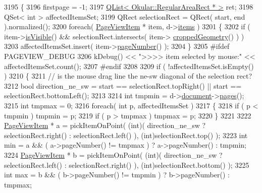 \begin{DoxyCode}
3195 \{
3196     firstpage = -1;
3197     \hyperlink{classQList}{QList< Okular::RegularAreaRect * >} ret;
3198     QSet< int > affectedItemsSet;
3199     QRect selectionRect = QRect( start, end ).normalized();
3200     \textcolor{keywordflow}{foreach}( \hyperlink{classPageViewItem}{PageViewItem} * item, d->\hyperlink{classPageViewPrivate_ad90c795dead9abfaa5818a94e00435bc}{items} )
3201     \{
3202         \textcolor{keywordflow}{if} ( item->\hyperlink{classPageViewItem_ae7a4dfa618d0cb56e01075842c67bf9f}{isVisible}() && selectionRect.intersects( item->
      \hyperlink{classPageViewItem_aa2c3e988ccbe9ee162b73d7f89ab0d02}{croppedGeometry}() ) )
3203             affectedItemsSet.insert( item->\hyperlink{classPageViewItem_ad75aab4c1ffd842bd5d54c0cfe84d1bf}{pageNumber}() );
3204     \}
3205 \textcolor{preprocessor}{#ifdef PAGEVIEW\_DEBUG}
3206     kDebug() << \textcolor{stringliteral}{">>>> item selected by mouse:"} << affectedItemsSet.count();
3207 \textcolor{preprocessor}{#endif}
3208 
3209     \textcolor{keywordflow}{if} ( !affectedItemsSet.isEmpty() )
3210     \{
3211         \textcolor{comment}{// is the mouse drag line the ne-sw diagonal of the selection rect?}
3212         \textcolor{keywordtype}{bool} direction\_ne\_sw = start == selectionRect.topRight() || start == selectionRect.bottomLeft();
3213 
3214         \textcolor{keywordtype}{int} tmpmin = d->\hyperlink{classPageViewPrivate_a50645b9853306cffd74e51efb677e5b4}{document}->\hyperlink{classOkular_1_1Document_aaf5d986758e25127946986abaa401bcd}{pages}();
3215         \textcolor{keywordtype}{int} tmpmax = 0;
3216         \textcolor{keywordflow}{foreach}( \textcolor{keywordtype}{int} p, affectedItemsSet )
3217         \{
3218             \textcolor{keywordflow}{if} ( p < tmpmin ) tmpmin = p;
3219             \textcolor{keywordflow}{if} ( p > tmpmax ) tmpmax = p;
3220         \}
3221 
3222         \hyperlink{classPageViewItem}{PageViewItem} * a = pickItemOnPoint( (\textcolor{keywordtype}{int})( direction\_ne\_sw ? selectionRect.right() : 
      selectionRect.left() ), (\textcolor{keywordtype}{int})selectionRect.top() );
3223         \textcolor{keywordtype}{int} min = a && ( a->pageNumber() != tmpmax ) ? a->pageNumber() : tmpmin;
3224         \hyperlink{classPageViewItem}{PageViewItem} * b = pickItemOnPoint( (\textcolor{keywordtype}{int})( direction\_ne\_sw ? selectionRect.left() : 
      selectionRect.right() ), (\textcolor{keywordtype}{int})selectionRect.bottom() );
3225         \textcolor{keywordtype}{int} max = b && ( b->pageNumber() != tmpmin ) ? b->pageNumber() : tmpmax;

\end{DoxyCode}
